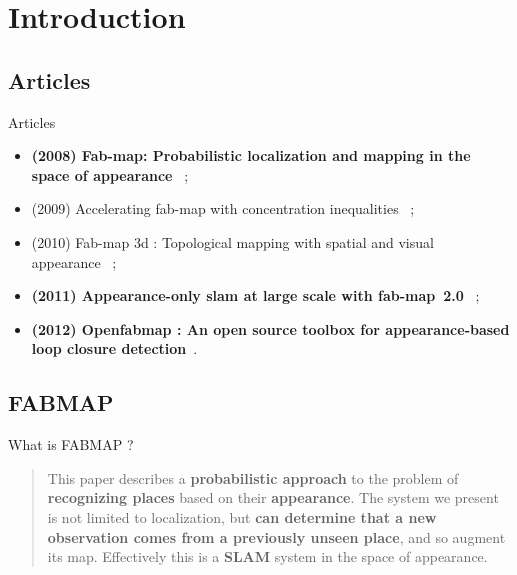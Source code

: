 \section{Introduction}


\subsection{Articles}
\begin{frame}{Articles}
    \leftmargini=0pt
    \begin{itemize}
        \item \textbf{(2008) Fab-map: Probabilistic localization and mapping in the space of appearance}~\cite{fabmap2008b} ;
        \item (2009) Accelerating fab-map with concentration inequalities~\cite{accelerating} ;
        \item (2010) Fab-map 3d : Topological mapping with spatial and visual appearance~\cite{fabmap3d} ;
        \item \textbf{(2011) Appearance-only slam at large scale with fab-map~2.0}~\cite{fabmap2011} ;
        \item \textbf{(2012) Openfabmap : An open source toolbox for appearance-based loop closure detection}~\cite{openfabmap}.
    \end{itemize}
\end{frame}

\subsection{FABMAP}
\begin{frame}{What is FABMAP ?}
    \begin{quotation}
        This paper describes a \textbf{probabilistic approach} to the problem of \textbf{recognizing places} based on their \textbf{appearance}. The system we present is not limited to localization, but \textbf{can determine that a new observation comes from a previously unseen place}, and so augment its map. Effectively this is a \textbf{SLAM} system in the space of appearance.~\cite{fabmap2008b}
    \end{quotation}
\end{frame}

